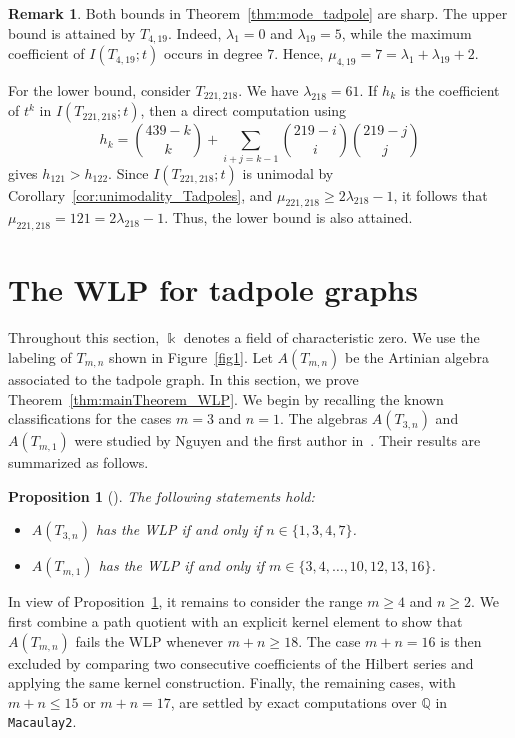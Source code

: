 \documentclass[12pt,twoside]{amsart}
\newtheorem{proposition}[thm]{Proposition}
\theoremstyle{definition}
\newtheorem{remark}[thm]{Remark}
\theoremstyle{mystyle}
\begin{document}
\begin{remark}\label{rem:sharp-mode-bounds}
Both bounds in Theorem~\ref{thm:mode_tadpole} are sharp. The upper bound is attained by $T_{4,19}$. Indeed,
$\lambda_1=0$ and $\lambda_{19}=5$, while the maximum coefficient of
$I(T_{4,19};t)$ occurs in degree $7$. Hence,
$\mu_{4,19}=7=\lambda_1+\lambda_{19}+2$.

For the lower bound, consider $T_{221,218}$. We have
$\lambda_{218}=61$. If $h_k$ is the coefficient of $t^k$ in $I(T_{221,218};t)$, then a direct computation using
\[
h_k=\binom{439-k}{k}
+\sum_{i+j=k-1}
\binom{219-i}{i}\binom{219-j}{j}
\]
gives $h_{121}>h_{122}$. Since $I(T_{221,218};t)$ is unimodal by Corollary~\ref{cor:unimodality_Tadpoles}, and $\mu_{221,218}\ge 2\lambda_{218}-1$, it
follows that
$\mu_{221,218}=121=2\lambda_{218}-1$. Thus, the lower bound is also
attained.
\end{remark}








   



\section{The WLP for tadpole graphs}
Throughout this section, $\Bbbk$ denotes a field of characteristic
zero. We use the labeling of $T_{m,n}$ shown in
Figure~\ref{fig1}. 
Let $A(T_{m,n})$
be the Artinian algebra associated to the tadpole graph.
In this section, we prove Theorem~\ref{thm:mainTheorem_WLP}. We begin by
recalling the known classifications for the cases $m=3$ and $n=1$.
The algebras $A(T_{3,n})$ and $A(T_{m,1})$ were studied by Nguyen and
the first author in~\cite{NT24b}. Their results are summarized as follows.

\begin{proposition}[{\cite[Corollary~4.5 and Theorem~4.7]{NT24b}}]
\label{pro:WLP_small_m_and_n}
The following statements hold:
\begin{itemize}
\item[(a)] $A(T_{3,n})$ has the WLP if and only if $n\in\{1,3,4,7\}$.
\item[(b)] $A(T_{m,1})$ has the WLP if and only if
$m\in\{3,4,\ldots,10,12,13,16\}$.
\end{itemize}
\end{proposition}
In view of Proposition~\ref{pro:WLP_small_m_and_n}, it remains to
consider the range $m\geq4$ and $n\geq2$. We first combine a path
quotient with an explicit kernel element to show that
$A(T_{m,n})$ fails the WLP whenever $m+n\geq18$.
The case $m+n=16$ is then excluded by comparing two consecutive
coefficients of the Hilbert series and applying the same kernel
construction. Finally, the remaining cases, with $m+n\leq15$
or $m+n=17$, are settled by exact computations over $\mathbb{Q}$
in \texttt{Macaulay2}.
\end{document}

